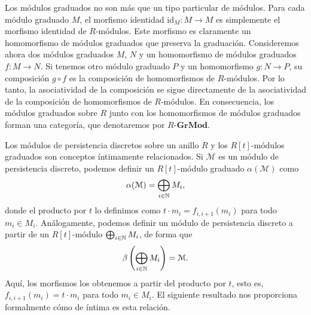 Los módulos graduados no son más que un tipo particular de módulos. Para cada
módulo graduado $M$, el morfismo identidad $\mathrm{id}_{M} : M \to M$ es simplemente
el morfismo identidad de $R$-módulos. Este morfismo es claramente un
homomorfismo de módulos graduados que preserva la graduación. Consideremos ahora
dos módulos graduados $M$, $N$ y un homomorfismo de módulos graduados
$f: M \to N$. Si tenemos otro módulo graduado $P$ y un homomorfismo $g: N \to P$,
su composición $g \circ f$ es la composición de homomorfismos de $R$-módulos. Por
lo tanto, la asociatividad de la composición se sigue directamente de la
asociatividad de la composición de homomorfismos de $R$-módulos. En consecuencia,
los módulos graduados sobre $R$ junto con los homomorfismos de módulos graduados
forman una categoría, que denotaremos por $R\text{-}\mathbf{GrMod}$.

Los módulos de persistencia discretos sobre un anillo $R$ y los $R[t]$-módulos graduados
son conceptos íntimamente relacionados. Si $\mathcal{M}$ es un módulo de
persistencia discreto, podemos definir un $R[t]$-módulo graduado $\alpha(\mathcal{M}
)$ como
\[
\alpha(\mathcal{M}) = \bigoplus_{i \in \mathbb{N}}M_{i},
\]
donde el producto por $t$ lo definimos como $t \cdot m_{i} = f_{i,i+1}(m_{i})$ para
todo $m_{i} \in M_{i}$. Análogamente, podemos definir un módulo de persistencia discreto
a partir de un $R[t]$-módulo $\bigoplus_{i \in \mathbb{N}}M_{i}$, de forma que
\[
\beta \left( \bigoplus_{i \in \mathbb{N}}M_{i} \right) = \mathcal{M}.
\]
Aquí, los morfismos los obtenemos a partir del producto por $t$, esto es, $f_{i,
	i+1}(m_{i}) = t \cdot m_{i}$ para todo $m_{i} \in M_{i}$. El siguiente resultado
nos proporciona formalmente cómo de íntima es esta relación.

